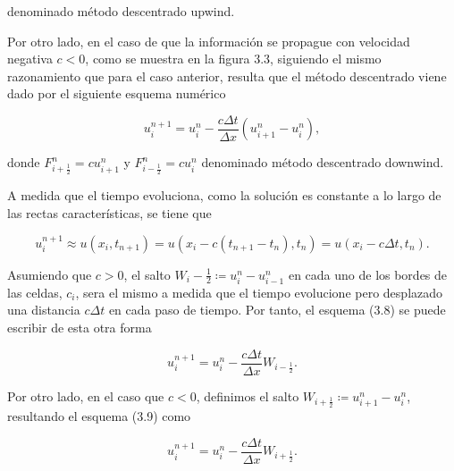 denominado método descentrado upwind.

Por otro lado, en el caso de que la información se propague con
velocidad negativa $c<0$, como se muestra en la figura 3.3, siguiendo
el mismo razonamiento que para el caso anterior, resulta que el
método descentrado viene dado por el siguiente esquema numérico

\begin{equation*}
  u^{n+1}_{i}=
  u^{n}_{i}-
  \frac{c\Delta t}{\Delta x}
  \left(
  u^{n}_{i+1}-
  u^{n}_{i}
  \right),
\end{equation*}

donde
\begin{math}
  F^{n}_{i+\frac{1}{2}}=
  cu^{n}_{i+1}
\end{math}
y
\begin{math}
  F^{n}_{i-\frac{1}{2}}=
  cu^{n}_{i}
\end{math}
denominado método descentrado downwind.

A medida que el tiempo evoluciona, como la solución es constante a lo
largo de las rectas características, se tiene que

\begin{equation*}
  u^{n+1}_{i}\approx
  u
  \left(x_{i},t_{n+1}\right)=
  u
  \left(
  x_{i}-
  c\left(t_{n+1}-t_{n}\right),
  t_{n}
  \right)=
  u
  \left(
  x_{i}-
  c\Delta t,t_{n}
  \right).
\end{equation*}

Asumiendo que $c>0$, el salto
\begin{math}
  W_{i}-\frac{1}{2}\coloneqq
  u^{n}_{i}-
  u_{i-1}^{n}
\end{math}
en cada uno de los bordes de las celdas, $c_{i}$, sera el mismo a
medida que el tiempo evolucione pero desplazado una distancia
$c\Delta t$ en cada paso de tiempo.
Por tanto, el esquema (3.8) se puede escribir de esta otra forma

\begin{equation*}
  u^{n+1}_{i}=
  u^{n}_{i}-
  \frac{c\Delta t}{\Delta x}
  W_{i-\frac{1}{2}}.
\end{equation*}

Por otro lado, en el caso que $c<0$, definimos el salto
$W_{i+\frac{1}{2}}\coloneqq u^{n}_{i+1}-u^{n}_{i}$, resultando el
esquema (3.9) como

\begin{equation*}
  u^{n+1}_{i}=
  u^{n}_{i}-
  \frac{c\Delta t}{\Delta x}
  W_{i+\frac{1}{2}}.
\end{equation*}

